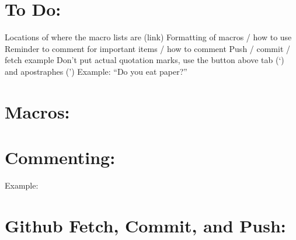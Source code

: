 

\section*{To Do:}
Locations of where the macro lists are (link)
Formatting of macros / how to use
Reminder to comment for important items / how to comment
Push / commit / fetch example
Don't put actual quotation marks, use the button above tab (`) and apostraphes (')
	Example: ``Do you eat paper?''

\section*{Macros:}

\section*{Commenting:}

Example: %

\section*{Github Fetch, Commit, and Push:}



